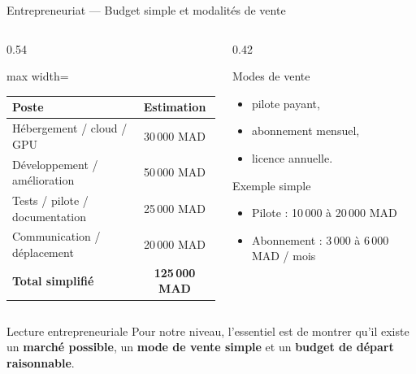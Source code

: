 \begin{frame}[t]{Entrepreneuriat --- Budget simple et modalités de vente}
\scriptsize
\begin{columns}[T,onlytextwidth]
\begin{column}{0.54\textwidth}
\renewcommand{\arraystretch}{1.08}
\begin{adjustbox}{max width=\linewidth}
\begin{tabular}{|p{4.1cm}|c|}
\hline
\textbf{Poste} & \textbf{Estimation} \\ \hline
Hébergement / cloud / GPU & 30\,000 MAD \\ \hline
Développement / amélioration & 50\,000 MAD \\ \hline
Tests / pilote / documentation & 25\,000 MAD \\ \hline
Communication / déplacement & 20\,000 MAD \\ \hline
\textbf{Total simplifié} & \textbf{125\,000 MAD} \\ \hline
\end{tabular}
\end{adjustbox}
\captionsetup{type=table}
\end{column}
\begin{column}{0.42\textwidth}
\begin{block}{Modes de vente}
\begin{itemize}
\setlength{\itemsep}{0.24em}
\item pilote payant,
\item abonnement mensuel,
\item licence annuelle.
\end{itemize}
\end{block}

\begin{block}{Exemple simple}
\begin{itemize}
\setlength{\itemsep}{0.2em}
\item Pilote : 10\,000 à 20\,000 MAD
\item Abonnement : 3\,000 à 6\,000 MAD / mois
\end{itemize}
\end{block}
\end{column}
\end{columns}

\begin{alertblock}{Lecture entrepreneuriale}
Pour notre niveau, l'essentiel est de montrer qu'il existe un \textbf{marché possible}, un \textbf{mode de vente simple} et un \textbf{budget de départ raisonnable}.
\end{alertblock}
\end{frame}

